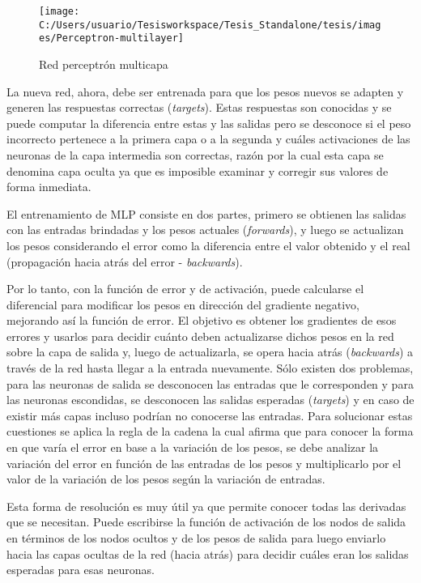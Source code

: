 \begin{figure}
\begin{centering}
\texttt{[image: C:/Users/usuario/Tesisworkspace/Tesis\_Standalone/tesis/images/Perceptron-multilayer]}
\par\end{centering}

\caption{Red perceptrón multicapa\label{fig:perceptron-neural-network-multilayer}}
\end{figure}


La nueva red, ahora, debe ser entrenada para que los pesos nuevos
se adapten y generen las respuestas correctas (\emph{targets}). Estas
respuestas son conocidas y se puede computar la diferencia entre estas
y las salidas pero se desconoce si el peso incorrecto pertenece a
la primera capa o a la segunda y cuáles activaciones de las neuronas
de la capa intermedia son correctas, razón por la cual esta capa se
denomina capa oculta ya que es imposible examinar y corregir sus valores
de forma inmediata. 

El entrenamiento de \ac{MLP} consiste en dos partes, primero se obtienen
las salidas con las entradas brindadas y los pesos actuales (\emph{forwards}),
y luego se actualizan los pesos considerando el error como la diferencia
entre el valor obtenido y el real (propagación hacia atrás del error
- \emph{backwards}). 

Por lo tanto, con la función de error y de activación, puede calcularse
el diferencial para modificar los pesos en dirección del gradiente
negativo, mejorando así la función de error. El objetivo es obtener
los gradientes de esos errores y usarlos para decidir cuánto deben
actualizarse dichos pesos en la red sobre la capa de salida y, luego
de actualizarla, se opera hacia atrás (\emph{backwards}) a través
de la red hasta llegar a la entrada nuevamente. Sólo existen dos problemas,
para las neuronas de salida se desconocen las entradas que le corresponden
y para las neuronas escondidas, se desconocen las salidas esperadas
(\emph{targets}) y en caso de existir más capas incluso podrían no
conocerse las entradas. Para solucionar estas cuestiones se aplica
la regla de la cadena la cual afirma que para conocer la forma en
que varía el error en base a la variación de los pesos, se debe analizar
la variación del error en función de las entradas de los pesos y multiplicarlo
por el valor de la variación de los pesos según la variación de entradas. 

Esta forma de resolución es muy útil ya que permite conocer todas
las derivadas que se necesitan. Puede escribirse la función de activación
de los nodos de salida en términos de los nodos ocultos y de los pesos
de salida para luego enviarlo hacia las capas ocultas de la red (hacia
atrás) para decidir cuáles eran los salidas esperadas para esas neuronas.


